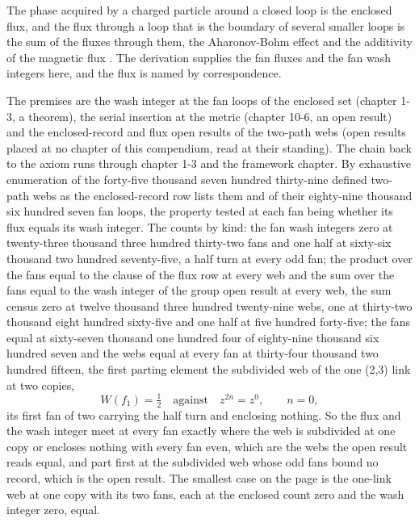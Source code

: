 \begin{chbridge}
The phase acquired by a charged particle around a closed loop is the enclosed flux, and the flux through a loop that is the boundary of several smaller loops is the sum of the fluxes through them, the Aharonov-Bohm effect and the additivity of the magnetic flux \cite{Aharonov1959,Berry1984}. The derivation supplies the fan fluxes and the fan wash integers here, and the flux is named by correspondence.
\end{chbridge}
\begin{chproof}[census]
The premises are the wash integer at the fan loops of the enclosed set (chapter 1-3, a theorem), the serial insertion at the metric (chapter 10-6, an open result) and the enclosed-record and flux open results of the two-path webs (open results placed at no chapter of this compendium, read at their standing). The chain back to the axiom runs through chapter 1-3 and the framework chapter. By exhaustive enumeration of the forty-five thousand seven hundred thirty-nine defined two-path webs as the enclosed-record row lists them and of their eighty-nine thousand six hundred seven fan loops, the property tested at each fan being whether its flux equals its wash integer. The counts by kind: the fan wash integers zero at twenty-three thousand three hundred thirty-two fans and one half at sixty-six thousand two hundred seventy-five, a half turn at every odd fan; the product over the fans equal to the clause of the flux row at every web and the sum over the fans equal to the wash integer of the group open result at every web, the sum census zero at twelve thousand three hundred twenty-nine webs, one at thirty-two thousand eight hundred sixty-five and one half at five hundred forty-five; the fans equal at sixty-seven thousand one hundred four of eighty-nine thousand six hundred seven and the webs equal at every fan at thirty-four thousand two hundred fifteen, the first parting element the subdivided web of the one (2,3) link at two copies,
\begin{equation}
W(f_{1}) = \tfrac{1}{2} \quad\text{against}\quad z^{2n} = z^{0} , \qquad n = 0 ,
\end{equation}
its first fan of two carrying the half turn and enclosing nothing. So the flux and the wash integer meet at every fan exactly where the web is subdivided at one copy or encloses nothing with every fan even, which are the webs the open result reads equal, and part first at the subdivided web whose odd fans bound no record, which is the open result. The smallest case on the page is the one-link web at one copy with its two fans, each at the enclosed count zero and the wash integer zero, equal.


\end{chproof}
